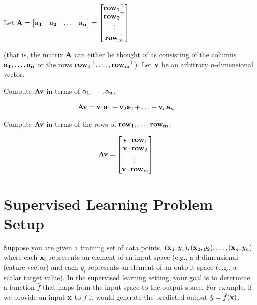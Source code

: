 \documentclass[assignment01_Solutions]{subfiles}
\begin{document}
\begin{exercise}[(20 minutes)]
\item Let $\mathbf{A} = \begin{bmatrix} \mathbf{a_1} & \mathbf{a_2} & \ldots & \mathbf{a_n} \end{bmatrix} = \begin{bmatrix} \mathbf{row_1}^\top \\ \mathbf{row_2}^\top \\ \vdots \\ \mathbf{row}_m^\top \end{bmatrix}$

(that is, the matrix $\mathbf{A}$ can either be thought of as consisting of the columns $\mathbf{a_1}, \ldots, \mathbf{a_n}$ or the rows $\mathbf{row_1}^\top, \ldots, \mathbf{row_m}^\top$).  Let $\mathbf{v}$ be an arbitrary $n$-dimensional vector.

Compute $\mathbf{A}\mathbf{v}$ in terms of $\mathbf{a_1}, \ldots, \mathbf{a_n}$.

\begin{boxedsolution}
\begin{align}
\mathbf{A} \mathbf{v} &= \mathbf{v}_1 \mathbf{a}_1 + \mathbf{v}_2 \mathbf{a}_2 + \ldots + \mathbf{v}_n \mathbf{a}_n
\end{align}
\end{boxedsolution}

Compute $\mathbf{A} \mathbf{v}$ in terms of the rows of $\mathbf{row_1}, \ldots, \mathbf{row_m}$.

\begin{boxedsolution}
\begin{align}
\mathbf{A} \mathbf{v} &= \begin{bmatrix} \mathbf{v} \cdot \mathbf{row}_1 \\   \mathbf{v} \cdot \mathbf{row}_2 \\ \vdots \\ \mathbf{v} \cdot \mathbf{row}_m \end{bmatrix}
\end{align}
\end{boxedsolution}

\ees
\end{exercise}


\section{Supervised Learning Problem Setup}
Suppose you are given a training set of data points, $(\mathbf{x_1}, y_1), (\mathbf{x}_2, y_2), \ldots, (\mathbf{x}_n, y_n)$ where each $\mathbf{x_i}$ represents an element of an input space (e.g., a d-dimensional feature vector) and each $y_i$ represents an element of an output space (e.g., a scalar target value).  In the supervised learning setting, your goal is to determine a function $\hat{f}$ that maps from the input space to the output space.  For example, if we provide an input $\mathbf{x}$ to $\hat{f}$ it would generate the predicted output $\hat{y} = \hat{f}(\mathbf{x})$.
\end{document}
